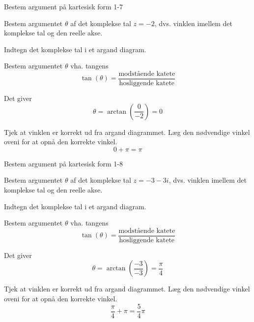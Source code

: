 \documentclass{article}
\begin{document}
\begin{exercise}{Bestem argument på kartesisk form 1-7}
	
	Bestem argumentet $\theta$ af det komplekse tal $z=-2$, dvs. vinklen imellem det komplekse tal og den reelle akse.
	
	\answerbox{\pi}
	
	
	\hint 
	
	Indtegn det komplekse tal i et argand diagram.
	
	
	\hint
	
	Bestem argumentet $\theta$ vha. tangens
	\[
	\tan(\theta)=\frac{\textrm{modstående katete}}{\textrm{hosliggende katete}}
	\]
	
	\hint 
	
	Det giver
	\[
	\theta = \arctan \left(\frac{0}{-2}\right) = 0
	\]
	
	\hint
	
	Tjek at vinklen er korrekt ud fra argand diagrammet. Læg den nødvendige vinkel oveni for at opnå den korrekte vinkel. 
	\[
	0+ \pi = \pi
	\]
	
	
\end{exercise}

\newpage

\begin{exercise}{Bestem argument på kartesisk form 1-8}
	
	Bestem argumentet $\theta$ af det komplekse tal $z=-3-3i$, dvs. vinklen imellem det komplekse tal og den reelle akse.
	
	
	
	\hint 
	
	Indtegn det komplekse tal i et argand diagram.
	
	
	\hint
	
	Bestem argumentet $\theta$ vha. tangens
	\[
	\tan(\theta)=\frac{\textrm{modstående katete}}{\textrm{hosliggende katete}}
	\]
	
	\hint 
	
	Det giver
	\[
	\theta = \arctan \left(\frac{-3}{-3}\right) = \frac{\pi}{4}
	\]
	
	\hint
	
	Tjek at vinklen er korrekt ud fra argand diagrammet. Læg den nødvendige vinkel oveni for at opnå den korrekte vinkel. 
	\[
	\frac{\pi}{4} + \pi = \frac{5}{4} \pi
	\]
	
	
\end{exercise}
\end{document}
